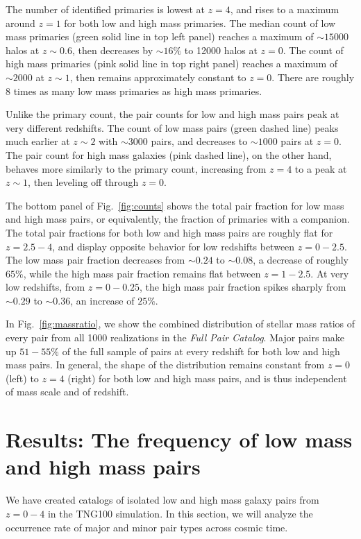 \documentclass[twocolumn]{aastex631}
\newcommand{\paircat}{\textit{Full Pair Catalog}}
\begin{document}
    The number of identified primaries is lowest at $z=4$, and rises to a maximum around $z=1$ for both low and high mass primaries.
    The median count of low mass primaries (green solid line in top left panel) reaches a maximum of $\sim15000$ halos at $z\sim0.6$, then decreases by $\sim16\%$ to 12000 halos at $z=0$. 
    The count of high mass primaries (pink solid line in top right panel) reaches a maximum of $\sim2000$ at $z\sim1$, then remains approximately constant to $z=0$. 
    There are roughly 8 times as many low mass primaries as high mass primaries. 

    Unlike the primary count, the pair counts for low and high mass pairs peak at very different redshifts. 
    The count of low mass pairs (green dashed line) peaks much earlier at $z\sim2$ with $\sim3000$ pairs, and decreases to $\sim1000$ pairs at $z=0$.
    The pair count for high mass galaxies (pink dashed line), on the other hand, behaves more similarly to the primary count, increasing from $z=4$ to a peak at $z\sim1$, then leveling off through $z=0$. 

    The bottom panel of Fig.~\ref{fig:counts} shows the total pair fraction for low mass and high mass pairs, or equivalently, the fraction of primaries with a companion.
    The total pair fractions for both low and high mass pairs are roughly flat for $z=2.5-4$, and display opposite behavior for low redshifts between $z=0-2.5$. 
    The low mass pair fraction decreases from $\sim0.24$ to $\sim0.08$, a decrease of roughly $65\%$, while the high mass pair fraction remains flat between $z=1-2.5$.
    At very low redshifts, from $z=0-0.25$, the high mass pair fraction spikes sharply from $\sim 0.29$ to $\sim 0.36$, an increase of $25\%$.

    In Fig.~\ref{fig:massratio}, we show the combined distribution of stellar mass ratios of every pair from all 1000 realizations in the \paircat.
    Major pairs make up $51-55\%$ of the full sample of pairs at every redshift for both low and high mass pairs.
    In general, the shape of the distribution remains constant from $z=0$ (left) to $z=4$ (right) for both low and high mass pairs, and is thus independent of mass scale and of redshift. 


\section{Results: The frequency of low mass and high mass pairs}
We have created catalogs of isolated low and high mass galaxy pairs from $z=0-4$ in the TNG100 simulation. 
In this section, we will analyze the occurrence rate of major and minor pair types across cosmic time. 
\end{document}
